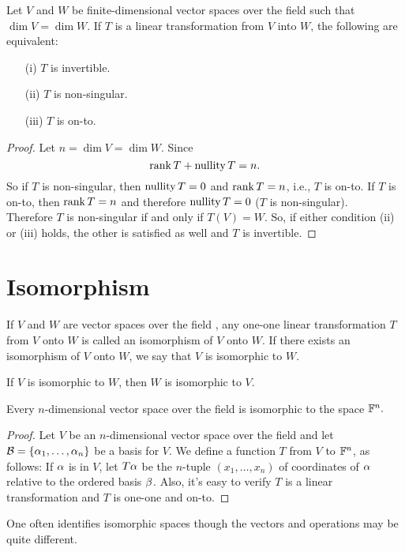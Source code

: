 \documentclass{mynotes}
\begin{document}
\begin{theorem}
Let $V$ and $W$ be finite-dimensional vector spaces over the field \F{} such that $\dim{V}=\dim{W}$. If $T$ is a linear transformation from $V$ into $W$, the following are equivalent:
\begin{itemize}
	\item[(i)]	$T$ is invertible.
	\item[(ii)] $T$ is non-singular.
	\item[(iii)] $T$ is on-to.
\end{itemize}
\end{theorem}
\begin{proof}
Let $n=\dim{V}=\dim{W}.$ Since $$\mathrm{rank}\,{T}+\mathrm{nullity}\,{T} = n.$$So if $T$ is non-singular, then $\mathrm{nullity}\,{T} = 0$ and $\mathrm{rank}\,{T}= n$, i.e., $T$ is on-to.
If $T$ is on-to, then $\mathrm{rank}\,{T} = n$ and therefore $\mathrm{nullity}\,{T} = 0$ ($T$ is non-singular). \\Therefore $T$ is non-singular if and only if $T(V)=W.$ So, if either condition (ii) or (iii) holds, the other is satisfied as well and $T$ is invertible.
\end{proof}
\section{Isomorphism}
\begin{definition}[isomorphism]
If $V$ and $W$ are vector spaces over the field \F, any one-one linear transformation $T$ from $V$ onto $W$ is called an isomorphism of $V$ onto $W$. If there exists an isomorphism of $V$ onto $W$, we say that $V$ is isomorphic to $W$.
\end{definition}
\begin{remark}
If $V$ is isomorphic to $W$, then $W$ is isomorphic to $V$.
\end{remark}
\begin{theorem}
Every $n$-dimensional vector space over the field \F is isomorphic to the space $\mathbb{F}^n.$
\end{theorem}
\begin{proof}
Let $V$ be an $n$-dimensional vector space over the field \F and let $\mathcal{B}=\{\alpha_1,\ldots,\alpha_n\}$ be a basis for $V$. We define a function $T$ from $V$ to $\mathbb{F}^n$, as follows: If $\alpha$ is in $V$, let $T\alpha$ be the $n$-tuple $(x_1,\ldots,x_n)$ of coordinates of $\alpha$ relative to the ordered basis $\mathcal{\beta}$. Also, it's easy to verify $T$ is a linear transformation and $T$ is one-one and on-to.
\end{proof}
\begin{remark}
One often identifies isomorphic spaces though the vectors and operations may be quite different.
\end{remark}
\end{document}
